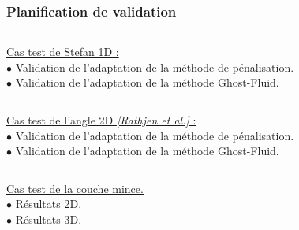 \documentclass{beamer}
\newcommand{\bib}[1]{{\color{cea_texte!80}\tiny\textit{[#1]}}}
\begin{document}
\begin{frame}
	\frametitle{Planification de validation}
	\footnotesize
	


	
	
\begin{columns}[c]
    \begin{column}{0.5 \textwidth}
    \color{cea_rouge}\underline{Cas test de Stefan 1D :}\color{cea_texte}\\
    	$\bullet$ Validation de l'adaptation de la méthode de pénalisation.\\
    	$\bullet$ Validation de l'adaptation de la méthode Ghost-Fluid.\\
    	


\end{column}
    \begin{column}{0.5 \textwidth}
		\begin{tikzpicture}[scale = 0.6, every node/.style={scale=0.6}]
			
		\end{tikzpicture}

   \end{column}
   \end{columns}	
   
   	
\begin{columns}[c]
    \begin{column}{0.5 \textwidth}
      \color{cea_rouge}\underline{Cas test de l'angle 2D \bib{Rathjen et al.} :}\color{cea_texte}\\
        $\bullet$ Validation de l'adaptation de la méthode de pénalisation.\\
    	$\bullet$ Validation de l'adaptation de la méthode Ghost-Fluid.\\
    	
\end{column}
    \begin{column}{0.5 \textwidth}
    		\center \begin{tikzpicture}[scale = 0.2, every node/.style={scale=0.2}]
			
		\end{tikzpicture}


   \end{column}
\end{columns}	


	\begin{columns}[c]
    \begin{column}{0.5 \textwidth}
	\color{cea_rouge}\underline{ Cas test de la couche mince.}\color{cea_texte}\\
	$\bullet$ Résultats 2D.\\
	$\bullet$ Résultats 3D.
	
	\end{column}
    \begin{column}{0.5 \textwidth}
\center\begin{tikzpicture}[scale =0.26, every node/.style={scale=0.3}]

\end{tikzpicture}

   \end{column}
\end{columns}
\end{frame}
\end{document}
